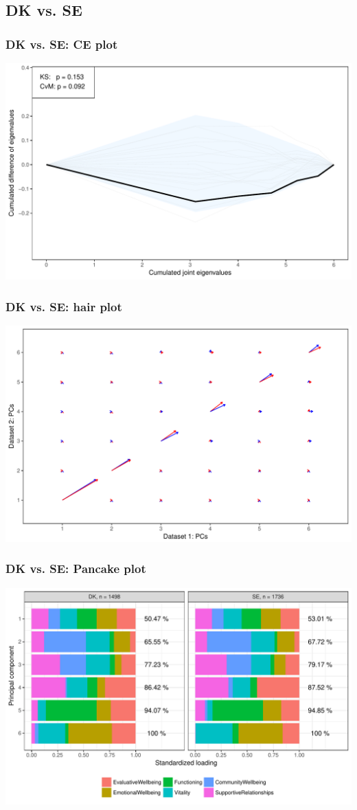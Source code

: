 \documentclass[a4]{beamer}
\begin{document}
\subsection{DK vs. SE}
\begin{frame}
\frametitle{DK vs. SE: CE plot}
\includegraphics[scale = 0.5]{essDKSEce.pdf}
\end{frame}

\begin{frame}
\frametitle{DK vs. SE: hair plot}
\includegraphics[scale = 0.5]{essDKSEhair.pdf}
\end{frame}

\begin{frame}
\frametitle{DK vs. SE: Pancake plot}
\includegraphics[scale = 0.5]{essDKSEpancake.pdf}
\end{frame}
\end{document}
